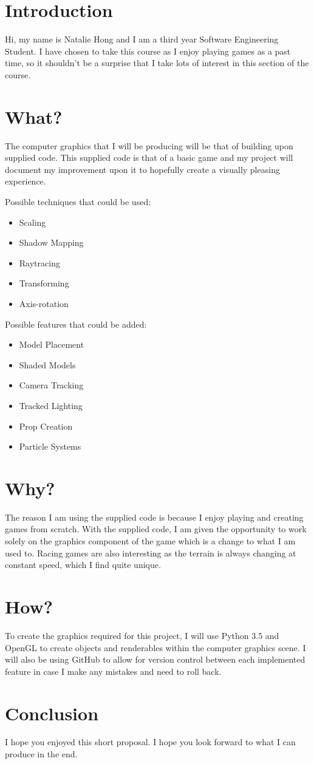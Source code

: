 \documentclass[11pt, oneside, a4paper]{article}
\begin{document}
\section*{Introduction}
Hi, my name is Natalie Hong and I am a third year Software Engineering Student. I have chosen to take this course as I enjoy playing games as a past time, so it shouldn't be a surprise that I take lots of interest in this section of the course.

\section*{What?}
The computer graphics that I will be producing will be that of building upon supplied code. This supplied code is that of a basic game and my project will document my improvement upon it to hopefully create a visually pleasing experience.

Possible techniques that could be used:
\begin{itemize}
    \item Scaling
    \item Shadow Mapping
    \item Raytracing
    \item Transforming
    \item Axis-rotation
\end{itemize}

Possible features that could be added:
\begin{itemize}
    \item Model Placement
    \item Shaded Models
    \item Camera Tracking
    \item Tracked Lighting
    \item Prop Creation
    \item Particle Systems
\end{itemize}

\section*{Why?}
The reason I am using the supplied code is because I enjoy playing and creating games from scratch. With the supplied code, I am given the opportunity to work solely on the graphics component of the game which is a change to what I am used to. Racing games are also interesting as the terrain is always changing at constant speed, which I find quite unique.

\section*{How?}
To create the graphics required for this project, I will use Python 3.5 and OpenGL to create objects and renderables within the computer graphics scene. I will also be using GitHub to allow for version control between each implemented feature in case I make any mistakes and need to roll back.


\section*{Conclusion}
I hope you enjoyed this short proposal. I hope you look forward to what I can produce in the end. 
\end{document}
